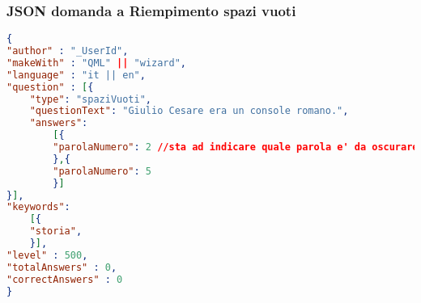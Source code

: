 \subsubsection{JSON domanda a Riempimento spazi vuoti}
\begin{lstlisting}[language=json,firstnumber=1]
{
"author" : "_UserId",
"makeWith" : "QML" || "wizard",
"language" : "it || en",
"question" : [{
	"type": "spaziVuoti",
	"questionText": "Giulio Cesare era un console romano.",
	"answers":
		[{
		"parolaNumero": 2 //sta ad indicare quale parola e' da oscurare. In questo caso la numero 2
		},{
		"parolaNumero": 5
		}]
}],
"keywords":
	[{
	"storia",
	}],
"level" : 500,
"totalAnswers" : 0,
"correctAnswers" : 0
}
\end{lstlisting}
